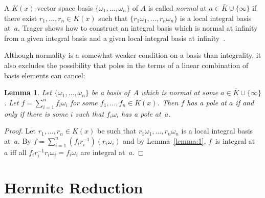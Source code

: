 \documentclass{sig-alternate-05-2015}
\newtheorem{lemma}[theorem]{Lemma}
\begin{document}
A $K(x)$-vector space basis $\{\omega_1,\dots,\omega_n\}$ of $A$ is
called \emph{normal} at $a\in\bar K\cup\{\infty\}$ if there exist $r_1,\dots,r_n\in
K(x)$ such that $\{r_1\omega_1,\dots,r_n\omega_n\}$ is a local integral basis
at~$a$. Trager shows how to construct
an integral basis which is normal at infinity from a given integral basis and
a given local integral basis at infinity~\cite{trager84}.

Although normality is a somewhat weaker condition on a basis than integrality,
it also excludes the possibility that poles in the terms of a linear combination
of basis elements can cancel:

\begin{lemma}\label{lemma:3}
  Let $\{\omega_1,\dots,\omega_n\}$ be a basis of~$A$
  which is normal at some $a\in\bar K\cup\{\infty\}$.
  Let $f=\sum_{i=1}^n f_i\omega_i$ for some $f_1,\dots,f_n\in K(x)$.
  Then $f$ has a pole at $a$ if and only if
  there is some $i$ such that $f_i\omega_i$ has a pole at~$a$.
\end{lemma}
\begin{proof}
  Let $r_1,\dots,r_n\in K(x)$ be such that $r_1\omega_1,\dots,r_n\omega_n$ is a
  local integral basis at~$a$. By $f=\sum_{i=1}^n
  (f_ir_i^{-1})(r_i\omega_i)$ and by Lemma~\ref{lemma:1}, $f$~is integral at~$a$ iff all
  $f_ir_i^{-1}r_i\omega_i=f_i\omega_i$ are integral at~$a$.
\end{proof}

\section{Hermite Reduction}\label{sec:hermite}
\end{document}
